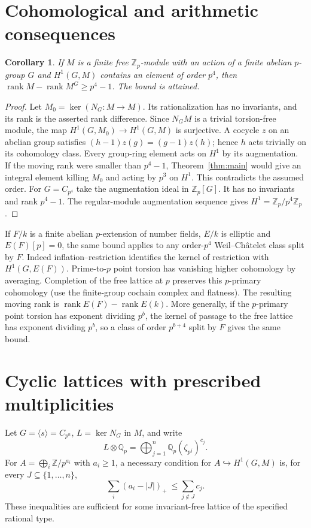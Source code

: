 \documentclass[11pt]{article}
\newtheorem{corollary}[theorem]{Corollary}
\newcommand{\Z}{\mathbb Z}
\newcommand{\Q}{\mathbb Q}
\newcommand{\rk}{\operatorname{rank}}
\begin{document}
\section{Cohomological and arithmetic consequences}
\begin{corollary}
If $M$ is a finite free $\Z_p$-module with an action of a finite
abelian $p$-group $G$ and $H^1(G,M)$ contains an element of order
$p^4$, then $\rk M-\rk M^G\ge p^4-1$. The bound is attained.
\end{corollary}
\begin{proof}
Let $M_0=\ker(N_G:M\to M)$. Its rationalization has no invariants,
and its rank is the asserted rank difference. Since $N_GM$ is a
trivial torsion-free module, the map $H^1(G,M_0)\to H^1(G,M)$ is
surjective. A cocycle $z$ on an abelian group satisfies
$(h-1)z(g)=(g-1)z(h)$; hence $h$ acts trivially on its cohomology
class. Every group-ring element acts on $H^1$ by its augmentation.
If the moving rank were smaller than $p^4-1$, Theorem~\ref{thm:main}
would give an integral element killing $M_0$ and acting by $p^3$ on
$H^1$. This contradicts the assumed order. For $G=C_{p^4}$ take the
augmentation ideal in $\Z_p[G]$. It has no invariants and rank
$p^4-1$. The regular-module augmentation sequence gives
$H^1=\Z_p/p^4\Z_p$.
\end{proof}

If $F/k$ is a finite abelian $p$-extension of number fields, $E/k$ is
elliptic and $E(F)[p]=0$, the same bound applies to any order-$p^4$
Weil--Ch\^atelet class split by $F$. Indeed inflation--restriction
identifies the kernel of restriction with $H^1(G,E(F))$.
Prime-to-$p$ point torsion has vanishing higher cohomology by averaging.
Completion of the free lattice at $p$ preserves this $p$-primary
cohomology (use the finite-group cochain complex and flatness).
The resulting moving rank is $\rk E(F)-\rk E(k)$. More generally,
if the $p$-primary point torsion has exponent dividing $p^b$, the kernel
of passage to the free lattice has exponent dividing $p^b$, so a class
of order $p^{b+4}$ split by $F$ gives the same bound.

\section{Cyclic lattices with prescribed multiplicities}
Let $G=\langle s\rangle=C_{p^n}$, $L=\ker N_G$ in $M$, and write
\[
 L\otimes\Q_p=\bigoplus_{j=1}^n\Q_p(\zeta_{p^j})^{c_j}.
\]
For $A=\bigoplus_i\Z/p^{a_i}$ with $a_i\ge1$, a necessary condition for
$A\hookrightarrow H^1(G,M)$ is, for every $J\subseteq\{1,\ldots,n\}$,
\begin{equation}\label{eq:flow}
 \sum_i(a_i-|J|)_+\ \le\sum_{j\notin J}c_j .
\end{equation}
These inequalities are sufficient for some invariant-free lattice of
the specified rational type.
\end{document}
